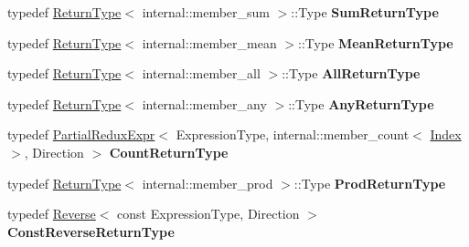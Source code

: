 \begin{DoxyCompactItemize}
typedef \mbox{\hyperlink{struct_eigen_1_1_vectorwise_op_1_1_return_type}{Return\+Type}}$<$ internal\+::member\+\_\+sum $>$\+::Type {\bfseries Sum\+Return\+Type}
\item 
\mbox{\label{class_eigen_1_1_vectorwise_op_abbac270de0591725661c5329395db586}} 
typedef \mbox{\hyperlink{struct_eigen_1_1_vectorwise_op_1_1_return_type}{Return\+Type}}$<$ internal\+::member\+\_\+mean $>$\+::Type {\bfseries Mean\+Return\+Type}
\item 
\mbox{\label{class_eigen_1_1_vectorwise_op_af20f1dc78338df553296e7cdb7836f3e}} 
typedef \mbox{\hyperlink{struct_eigen_1_1_vectorwise_op_1_1_return_type}{Return\+Type}}$<$ internal\+::member\+\_\+all $>$\+::Type {\bfseries All\+Return\+Type}
\item 
\mbox{\label{class_eigen_1_1_vectorwise_op_a1a9f45c1a8ae261357be82909374cd6b}} 
typedef \mbox{\hyperlink{struct_eigen_1_1_vectorwise_op_1_1_return_type}{Return\+Type}}$<$ internal\+::member\+\_\+any $>$\+::Type {\bfseries Any\+Return\+Type}
\item 
\mbox{\label{class_eigen_1_1_vectorwise_op_aba8dcafdbab5f9964b3ba9e68525ef35}} 
typedef \mbox{\hyperlink{class_eigen_1_1_partial_redux_expr}{Partial\+Redux\+Expr}}$<$ Expression\+Type, internal\+::member\+\_\+count$<$ \mbox{\hyperlink{class_eigen_1_1_vectorwise_op_a4907c654e5810edd98e4162093b19532}{Index}} $>$, Direction $>$ {\bfseries Count\+Return\+Type}
\item 
\mbox{\label{class_eigen_1_1_vectorwise_op_ab5f3ce92718978e329012c75b3661838}} 
typedef \mbox{\hyperlink{struct_eigen_1_1_vectorwise_op_1_1_return_type}{Return\+Type}}$<$ internal\+::member\+\_\+prod $>$\+::Type {\bfseries Prod\+Return\+Type}
\item 
\mbox{\label{class_eigen_1_1_vectorwise_op_a7747054450f740d031416b602693fba3}} 
typedef \mbox{\hyperlink{class_eigen_1_1_reverse}{Reverse}}$<$ const Expression\+Type, Direction $>$ {\bfseries Const\+Reverse\+Return\+Type}
\item 
\mbox{\label{class_eigen_1_1_vectorwise_op_a18b03561c0b677e71a8b8ff03768ff47}} 

\end{DoxyCompactItemize}
